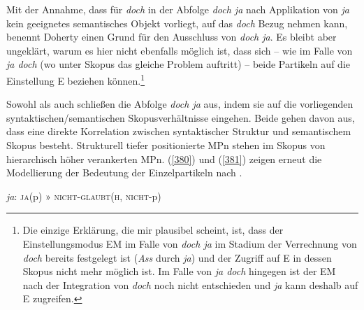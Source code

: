 Mit der Annahme, dass für \textit{doch} in der Abfolge \textit{doch ja} nach Applikation von \textit{ja} kein geeignetes semantisches Objekt vorliegt, auf das \textit{doch} Bezug nehmen kann, benennt Doherty einen Grund für den Ausschluss von \textit{doch ja}. Es bleibt aber ungeklärt, warum es hier nicht ebenfalls möglich ist, dass sich – wie im Falle von \textit{ja doch} (wo unter Skopus das gleiche Problem auftritt) – beide Partikeln auf die Einstellung E beziehen können.\footnote{Die einzige Erklärung, die mir plausibel scheint, ist, dass der Einstellungsmodus EM im Falle von \textit{doch ja} im Stadium der Verrechnung von \textit{doch} bereits festgelegt ist (\textit{Ass} durch \textit{ja}) und der Zugriff auf E in dessen Skopus nicht mehr möglich ist. Im Falle von \textit{ja doch} hingegen ist der EM nach der Integration von \textit{doch} noch nicht entschieden und \textit{ja} kann deshalb auf E zugreifen.}\pagebreak

Sowohl \citet{Ormelius-Sandblom1997} als auch \citet{Rinas2006, Rinas2007} schließen die Abfolge \textit{doch ja} aus, indem sie auf die vorliegenden syntaktischen/semantischen Skopusverhältnisse eingehen. Beide gehen davon aus, dass eine direkte Korrelation zwischen syntaktischer Struktur und semantischem Skopus besteht. Strukturell tiefer positionierte MPn stehen im Skopus von hierarchisch höher verankerten MPn. (\ref{380}) und (\ref{381}) zeigen erneut die Modellierung der Bedeutung der Einzelpartikeln nach \citet[420]{Rinas2007}.

\begin{exe}
	\ex\label{380} 
	\textit{ja}: \textsc{ja}(p) » \textsc{nicht-glaubt}(\textsc{h}, \textsc{nicht}-p)
\end{exe}

